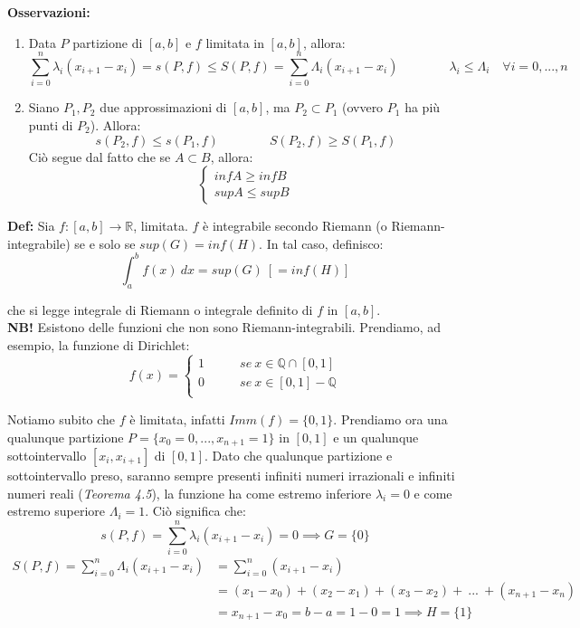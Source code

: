 \documentclass{article}
\begin{document}
\noindent\textbf{Osservazioni:}
\begin{enumerate}
    \item Data $P$ partizione di $[a, b]$ e $f$ limitata in $[a, b]$, allora: $$\sum_{i = 0}^n \lambda_i(x_{i + 1} - x_i) = s(P, f) \leq S(P, f) = \sum_{i = 0}^n \Lambda_i(x_{i + 1} - x_i) \qquad \qquad \lambda_i \leq \Lambda_i \quad \forall i = 0, ..., n$$
    \item Siano $P_1, P_2$ due approssimazioni di $[a, b]$, ma $P_2 \subset P_1$ (ovvero $P_1$ ha più punti di $P_2$). Allora: $$s(P_2, f) \leq s(P_1, f) \qquad \qquad S(P_2, f) \geq S(P_1, f)$$ Ciò segue dal fatto che se $A \subset B$, allora: $$\begin{cases}
        infA \geq infB \\ 
        supA \leq supB
    \end{cases}$$
\end{enumerate}

\noindent\textbf{Def:} Sia $f: [a, b] \xrightarrow{} \mathbb{R}$, limitata. $f$ è integrabile secondo Riemann (o Riemann-integrabile) se e solo se $sup(G) = inf(H)$. In tal caso, definisco:
\begin{equation*}
    \int_a^b f(x) \ dx = sup(G) \ [= inf(H)]
\end{equation*}

\noindent che si legge integrale di Riemann o integrale definito di $f$ in $[a, b]$.\\

\noindent\textbf{NB!} Esistono delle funzioni che non sono Riemann-integrabili. Prendiamo, ad esempio, la funzione di Dirichlet:
\begin{equation*}
    f(x) = \begin{cases}
        1 & \qquad se \ x \in \mathbb{Q} \cap [0, 1] \\
        0 & \qquad se \ x \in [0, 1] - \mathbb{Q} \\
    \end{cases}
\end{equation*}

\noindent Notiamo subito che $f$ è limitata, infatti $Imm(f) = \{0, 1\}$. Prendiamo ora una qualunque partizione $P = \{x_0 = 0, ..., x_{n + 1} = 1\}$ in $[0, 1]$ e un qualunque sottointervallo $[x_i, x_{i + 1}]$ di $[0, 1]$. Dato che qualunque partizione e sottointervallo preso, saranno sempre presenti infiniti numeri irrazionali e infiniti numeri reali (\textit{Teorema 4.5}), la funzione ha come estremo inferiore $\lambda_i = 0$ e come estremo superiore $\Lambda_i = 1$. Ciò significa che:
\begin{equation*}
    s(P, f) = \sum_{i = 0}^n \lambda_i (x_{i + 1} - x_i) = 0 \implies G = \{0\}
\end{equation*}
\begin{align*}
    S(P, f) = \sum_{i = 0}^n \Lambda_i (x_{i + 1} - x_i) &= \sum_{i = 0}^n (x_{i + 1} - x_i) \\
    &= (x_1 - x_0) + (x_2 - x_1) + (x_3 - x_2) + \ ... \ + (x_{n + 1} - x_n) \\ 
    &= x_{n + 1} - x_0 = b - a = 1 - 0 = 1
    \implies H = \{1\} 
\end{align*}
\end{document}
